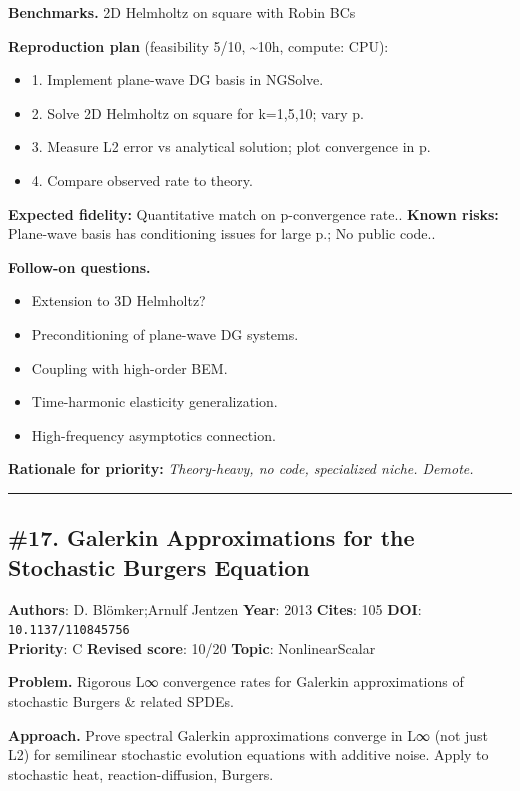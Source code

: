 \documentclass[10pt,letterpaper]{article}
\begin{document}
\textbf{Benchmarks.} 2D Helmholtz on square with Robin BCs

\textbf{Reproduction plan} (feasibility 5/10, \textasciitilde10h, compute: CPU):
\begin{itemize}
\item 1. Implement plane-wave DG basis in NGSolve.
\item 2. Solve 2D Helmholtz on square for k=1,5,10; vary p.
\item 3. Measure L2 error vs analytical solution; plot convergence in p.
\item 4. Compare observed rate to theory.
\end{itemize}
\textbf{Expected fidelity:} Quantitative match on p-convergence rate.. \textbf{Known risks:} Plane-wave basis has conditioning issues for large p.; No public code..

\textbf{Follow-on questions.}
\begin{itemize}
\item Extension to 3D Helmholtz?
\item Preconditioning of plane-wave DG systems.
\item Coupling with high-order BEM.
\item Time-harmonic elasticity generalization.
\item High-frequency asymptotics connection.
\end{itemize}

\textbf{Rationale for priority:} \emph{Theory-heavy, no code, specialized niche. Demote.}

\medskip\hrule\medskip

\subsection*{\#17. Galerkin Approximations for the Stochastic Burgers Equation}
\textbf{Authors}: D. Blömker;Arnulf Jentzen \textbullet{} \textbf{Year}: 2013 \textbullet{} \textbf{Cites}: 105 \textbullet{} \textbf{DOI}: \texttt{10.1137/110845756} \\
\textbf{Priority}: C \textbullet{} \textbf{Revised score}: 10/20 \textbullet{} \textbf{Topic}: NonlinearScalar

\textbf{Problem.} Rigorous L∞ convergence rates for Galerkin approximations of stochastic Burgers \& related SPDEs.

\textbf{Approach.} Prove spectral Galerkin approximations converge in L∞ (not just L2) for semilinear stochastic evolution equations with additive noise. Apply to stochastic heat, reaction-diffusion, Burgers.
\end{document}
